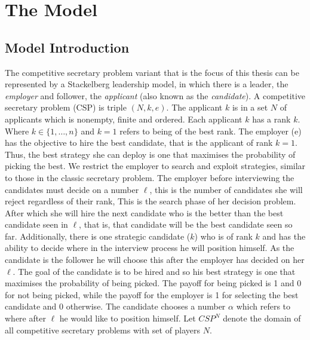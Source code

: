 \documentclass{article}
\begin{document}
\section{The Model}

\subsection{Model Introduction}

The competitive secretary problem variant that is the focus of this thesis can be represented by a Stackelberg leadership model, in which there is a leader, the \emph{employer} and follower, the \emph{applicant} (also known as the \emph{candidate}). A competitive secretary problem (CSP) is triple $(N,k,e)$. The applicant $k$ is in a set $N$ of applicants which is nonempty, finite and ordered. Each applicant $k$ has a rank $k$. Where $k\in \{1, \ldots, n \}$ and $ k=1$ refers to being of the best rank. The employer (e) has the objective to hire the best candidate, that is the applicant of rank $k=1$. Thus, the best strategy she can deploy is one that maximises the probability of picking the best. We restrict the employer to search and exploit strategies, similar to those in the classic secretary problem. The employer before interviewing the candidates must decide on a number $\ell$, this is the number of candidates she will reject regardless of their rank, This is the search phase of her decision problem. After which she will hire the next candidate who is the better than the best candidate seen in $\ell$, that is, that candidate will be the best candidate seen so far. Additionally, there is one strategic candidate ($k$) who is of rank $k$ and has the ability to decide where in the interview process he will position himself. As the candidate is the follower he will choose this after the employer has decided on her $\ell$. The goal of the candidate is to be hired and so his best strategy is one that maximises the probability of being picked. The payoff for being picked is 1 and 0 for not being picked, while the payoff for the employer is 1 for selecting the best candidate and 0 otherwise. The candidate chooses a number $\alpha$ which refers to where after $\ell$ he would like to position himself. Let $CSP^N$ denote the domain of all competitive secretary problems with set of players $N$.
\\[2ex]
\end{document}
